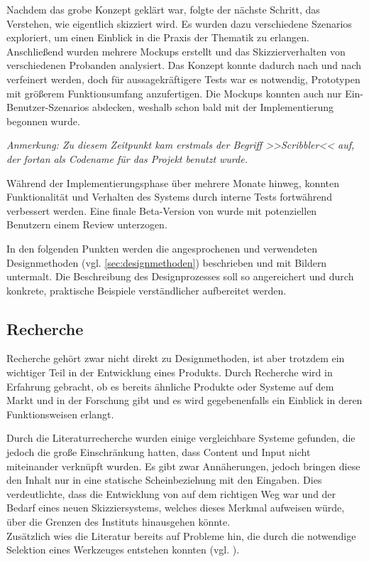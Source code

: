 Nachdem das grobe Konzept geklärt war, folgte der nächste Schritt, das Verstehen, wie eigentlich skizziert wird. Es wurden dazu verschiedene Szenarios exploriert, um einen Einblick in die Praxis der Thematik zu erlangen. Anschließend wurden mehrere Mockups erstellt und das Skizzierverhalten von verschiedenen Probanden analysiert. Das Konzept konnte dadurch nach und nach verfeinert werden, doch für aussagekräftigere Tests war es notwendig, Prototypen mit größerem Funktionsumfang anzufertigen. Die Mockups konnten auch nur Ein-Benutzer-Szenarios abdecken, weshalb schon bald mit der Implementierung begonnen wurde.

\bigskip \emph{Anmerkung: \graffito{\(\clubsuit\)} Zu diesem Zeitpunkt kam erstmals der Begriff >>Scribbler<< auf, der fortan als Codename für das Projekt benutzt wurde.}
\bigskip

Während der Implementierungsphase über mehrere Monate hinweg, konnten Funktionalität und Verhalten des Systems durch interne Tests fortwährend verbessert werden. Eine finale Beta-Version von \scribbler wurde mit potenziellen Benutzern einem Review unterzogen.

\medskip In den folgenden Punkten werden die angesprochenen und verwendeten Designmethoden (vgl. \autoref{sec:designmethoden}) beschrieben und mit Bildern untermalt. Die Beschreibung des Designprozesses soll so angereichert und durch konkrete, praktische Beispiele verständlicher aufbereitet werden.

\subsection{Recherche}
Recherche gehört zwar nicht direkt zu Designmethoden, ist aber trotzdem ein wichtiger Teil in der Entwicklung eines Produkts. Durch Recherche wird in Erfahrung gebracht, ob es bereits ähnliche Produkte oder Systeme auf dem Markt und in der Forschung gibt und es wird gegebenenfalls ein Einblick in deren Funktionsweisen erlangt.

\medskip Durch die Literaturrecherche wurden einige vergleichbare Systeme gefunden, die jedoch die große Einschränkung hatten, dass Content und Input nicht miteinander verknüpft wurden. Es gibt zwar Annäherungen, jedoch bringen diese den Inhalt nur in eine statische Scheinbeziehung mit den Eingaben. Dies verdeutlichte, dass die Entwicklung von \scribbler auf dem richtigen Weg war und der Bedarf eines neuen Skizziersystems, welches dieses Merkmal aufweisen würde, über die Grenzen des Instituts hinausgehen könnte. \\
Zusätzlich wies die Literatur bereits auf Probleme hin, die durch die notwendige Selektion eines Werkzeuges entstehen konnten (vgl. ).

